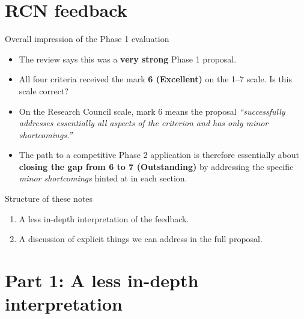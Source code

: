\documentclass[10pt,aspectratio=169]{beamer}
\begin{document}
\section{RCN feedback}
\begin{frame}{Overall impression of the Phase 1 evaluation}
  \begin{itemize}
    \item The review says this  was a \textbf{very strong} Phase 1 proposal.
    \item All four criteria received the mark \textbf{6 (Excellent)} on the 1--7 scale. Is this scale correct?
    \item On the Research Council scale, mark 6 means the proposal
          \emph{``successfully addresses essentially all aspects of the criterion and has only minor shortcomings.''}
    \item The path to a competitive Phase 2 application is therefore essentially about
          \textbf{closing the gap from 6 to 7 (Outstanding)} by addressing the specific
          \emph{minor shortcomings} hinted at in each section.
  \end{itemize}
  \vfill
  \begin{block}{Structure of these notes}
    \begin{enumerate}
      \item A less in-depth interpretation of the feedback.
      \item A discussion of explicit things we can address in the full proposal.
    \end{enumerate}
  \end{block}
\end{frame}

\section{Part 1: A less in-depth interpretation}
\end{document}

